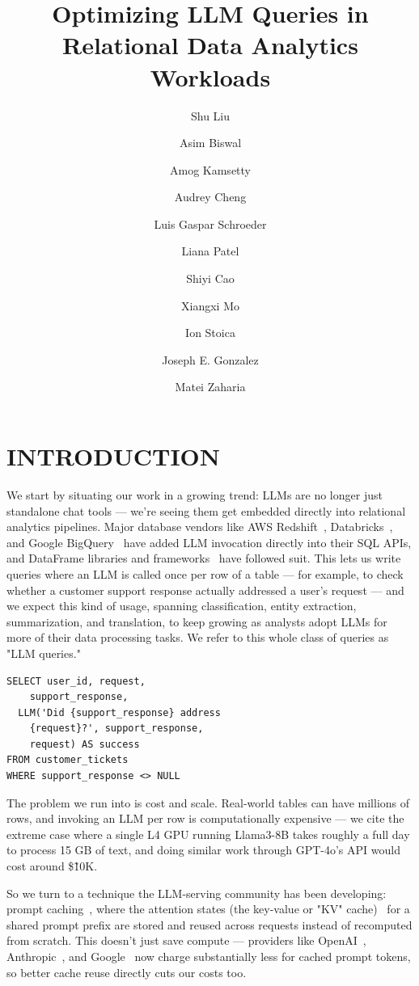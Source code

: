 \documentclass[manuscript,review]{acmart}
\title{Optimizing LLM Queries in Relational Data Analytics Workloads}
\author{Shu Liu}
\affiliation{\institution{UC Berkeley}\country{USA}}
\author{Asim Biswal}
\affiliation{\institution{UC Berkeley}\country{USA}}
\author{Amog Kamsetty}
\affiliation{\institution{UC Berkeley}\country{USA}}
\author{Audrey Cheng}
\affiliation{\institution{UC Berkeley}\country{USA}}
\author{Luis Gaspar Schroeder}
\affiliation{\institution{UC Berkeley}\country{USA}}
\affiliation{\institution{Technical University of Munich}\country{Germany}}
\author{Liana Patel}
\affiliation{\institution{Stanford University}\country{USA}}
\author{Shiyi Cao}
\affiliation{\institution{UC Berkeley}\country{USA}}
\author{Xiangxi Mo}
\affiliation{\institution{UC Berkeley}\country{USA}}
\author{Ion Stoica}
\affiliation{\institution{UC Berkeley}\country{USA}}
\author{Joseph E. Gonzalez}
\affiliation{\institution{UC Berkeley}\country{USA}}
\author{Matei Zaharia}
\affiliation{\institution{UC Berkeley}\country{USA}}
\begin{document}
\maketitle
\section{INTRODUCTION}
We start by situating our work in a growing trend: LLMs are no longer just standalone chat tools — we're seeing them get embedded directly into relational analytics pipelines. Major database vendors like AWS Redshift~\cite{aws_redshift_llm}, Databricks~\cite{databricks_ai_functions}, and Google BigQuery~\cite{bigquery_llm} have added LLM invocation directly into their SQL APIs, and DataFrame libraries and frameworks~\cite{chase2022langchain,patel2024lotus} have followed suit. This lets us write queries where an LLM is called once per row of a table — for example, to check whether a customer support response actually addressed a user's request — and we expect this kind of usage, spanning classification, entity extraction, summarization, and translation, to keep growing as analysts adopt LLMs for more of their data processing tasks. We refer to this whole class of queries as "LLM queries."

\begin{tcolorbox}[colback=white, colframe=black, boxrule=0.6pt, arc=1pt, left=4pt, right=4pt, top=2pt, bottom=2pt]
\begin{lstlisting}[style=sqlstyle]
SELECT user_id, request,
    support_response,
  LLM('Did {support_response} address
    {request}?', support_response,
    request) AS success
FROM customer_tickets
WHERE support_response <> NULL
\end{lstlisting}
\end{tcolorbox}

The problem we run into is cost and scale. Real-world tables can have millions of rows, and invoking an LLM per row is computationally expensive — we cite the extreme case where a single L4 GPU running Llama3-8B takes roughly a full day to process 15 GB of text, and doing similar work through GPT-4o's API would cost around \$\~10K.

So we turn to a technique the LLM-serving community has been developing: prompt caching~\cite{kwon2023vllm,zheng2023sglang,ye2024cascade,juravsky2024hydragen,gim2024promptcache}, where the attention states (the key-value or "KV" cache)~\cite{vaswani2023attention} for a shared prompt prefix are stored and reused across requests instead of recomputed from scratch. This doesn't just save compute — providers like OpenAI~\cite{openai_pricing}, Anthropic~\cite{anthropic_prompt_caching}, and Google~\cite{gemini_context_caching} now charge substantially less for cached prompt tokens, so better cache reuse directly cuts our costs too.
\end{document}
